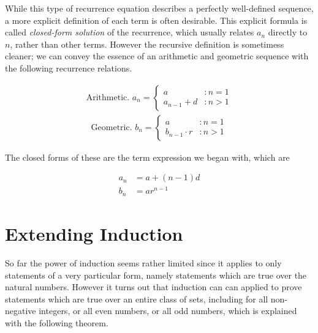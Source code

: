 While this type of recurrence equation describes a perfectly well-defined sequence, a more explicit definition of each term is often desirable. This explicit formula is called \emph{closed-form solution} of the recurrence, which usually relates $a_n$ directly to $n$, rather than other terms. However the recursive definition is sometimess cleaner; we can convey the essence of an arithmetic and geometric sequence with the following recurrence relations.

\begin{align*}
	\text{Arithmetic. } a_n = \begin{cases}
		a &: n = 1 \\
		a_{n - 1} + d &: n > 1
	\end{cases} 
\end{align*}
\begin{align*}
	\text{Geometric. } b_n = \begin{cases}
 		a &: n = 1 \\
 		b_{n - 1} \cdot r &: n > 1
	\end{cases}
\end{align*}

The closed forms of these are the term expression we began with, which are

\begin{align*}
	a_n &= a + (n - 1)d \\
	b_n &= a r^{n - 1}
\end{align*}

\section{Extending Induction}

So far the power of induction seems rather limited since it applies to only statements of a very particular form, namely statements which are true over the natural numbers. However it turns out that induction can can applied to prove statements which are true over an entire class of sets, including for all non-negative integers, or all even numbers, or all odd numbers, which is explained with the following theorem.

